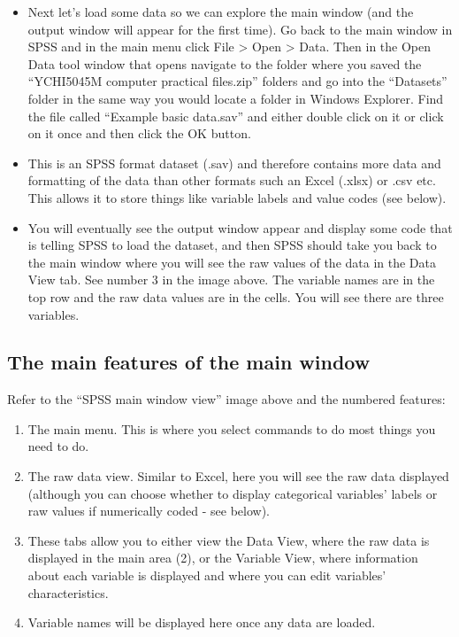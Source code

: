 \documentclass[
]{book}
\begin{document}
\begin{itemize}
\item
  Next let's load some data so we can explore the main window (and the output window will appear for the first time). Go back to the main window in SPSS and in the main menu click File \textgreater{} Open \textgreater{} Data. Then in the Open Data tool window that opens navigate to the folder where you saved the ``YCHI5045M computer practical files.zip'' folders and go into the ``Datasets'' folder in the same way you would locate a folder in Windows Explorer. Find the file called ``Example basic data.sav'' and either double click on it or click on it once and then click the OK button.
\item
  This is an SPSS format dataset (.sav) and therefore contains more data and formatting of the data than other formats such an Excel (.xlsx) or .csv etc. This allows it to store things like variable labels and value codes (see below).
\item
  You will eventually see the output window appear and display some code that is telling SPSS to load the dataset, and then SPSS should take you back to the main window where you will see the raw values of the data in the Data View tab. See number 3 in the image above. The variable names are in the top row and the raw data values are in the cells. You will see there are three variables.
\end{itemize}

\hypertarget{the-main-features-of-the-main-window}{%
\subsection{The main features of the main window}\label{the-main-features-of-the-main-window}}

Refer to the ``SPSS main window view'' image above and the numbered features:

\begin{enumerate}
\def\labelenumi{\arabic{enumi}.}
\item
  The main menu. This is where you select commands to do most things you need to do.
\item
  The raw data view. Similar to Excel, here you will see the raw data displayed (although you can choose whether to display categorical variables' labels or raw values if numerically coded - see below).
\item
  These tabs allow you to either view the Data View, where the raw data is displayed in the main area (2), or the Variable View, where information about each variable is displayed and where you can edit variables' characteristics.
\item
  Variable names will be displayed here once any data are loaded.
\end{enumerate}
\end{document}
